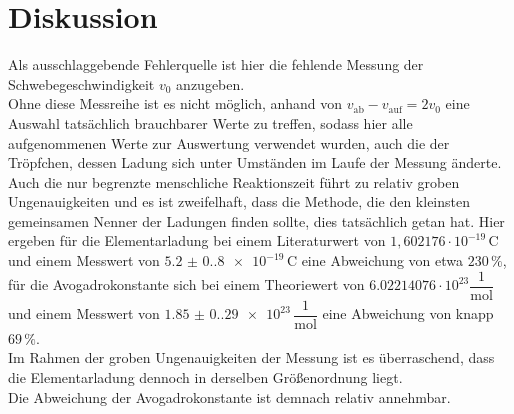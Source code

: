 \section{Diskussion}

Als ausschlaggebende Fehlerquelle ist hier die fehlende Messung der Schwebegeschwindigkeit $v_0$ anzugeben.\\
Ohne diese Messreihe ist es nicht möglich, anhand von $v_\text{ab} - v_\text{auf} = 2 v_0$ eine Auswahl tatsächlich brauchbarer Werte zu treffen, sodass hier alle aufgenommenen Werte zur Auswertung verwendet wurden,
auch die der Tröpfchen, dessen Ladung sich unter Umständen im Laufe der Messung änderte. \\
Auch die nur begrenzte menschliche Reaktionszeit führt zu relativ groben Ungenauigkeiten und es ist zweifelhaft, dass die Methode, die den kleinsten gemeinsamen Nenner der Ladungen finden sollte, dies
tatsächlich getan hat.
Hier ergeben für die Elementarladung bei einem Literaturwert von $1,602176 \cdot 10^{-19} \,\si{\coulomb}$ \cite{elchar} und einem
Messwert von $\qty{5.2(0.8)e-19} \,\si{\coulomb}$ eine Abweichung von etwa $230 \,\%$, für die Avogadrokonstante sich bei einem Theoriewert von $6.02214076 \cdot 10^{23} \dfrac{1}{\si{\mol}}$ \cite{na} und einem Messwert von $\qty{1.85(0.29)e23} \,\dfrac{1}{\si{\mol}}$ eine Abweichung von knapp
$69 \,\%$. \\

Im Rahmen der groben Ungenauigkeiten der Messung ist es überraschend, dass die Elementarladung dennoch in derselben Größenordnung liegt. \\
Die Abweichung der Avogadrokonstante ist demnach relativ annehmbar.
